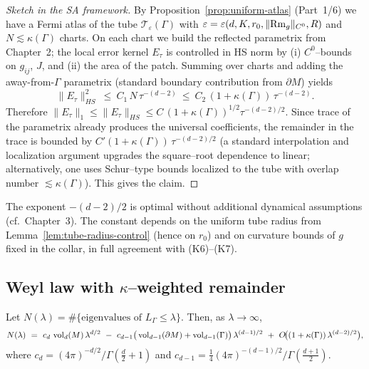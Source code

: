 \begin{proof}[Sketch in the SA framework]
By Proposition~\ref{prop:uniform-atlas} (Part~1/6) we have a Fermi atlas of the tube $\mathcal{T}_\varepsilon(\Gamma)$ with $\varepsilon=\varepsilon(d,K,r_0,\|{\rm Rm}_g\|_{C^0},R)$ and $N\lesssim \kappa(\Gamma)$ charts. On each chart we build the reflected parametrix from Chapter~2; the local error kernel $E_\tau$ is controlled in HS norm by (i) $C^0$–bounds on $g_{ij}$, $J$, and (ii) the area of the patch. Summing over charts and adding the away-from-$\Gamma$ parametrix (standard boundary contribution from $\partial M$) yields
\[
\|E_\tau\|_{HS}^2\ \le\ C_1\,N\,\tau^{-(d-2)}\ \le\ C_2\,(1+\kappa(\Gamma))\,\tau^{-(d-2)}.
\]
Therefore $\|E_\tau\|_1\le \|E_\tau\|_{HS}\le C\,(1+\kappa(\Gamma))^{1/2}\tau^{-(d-2)/2}$. Since trace of the parametrix already produces the universal coefficients, the remainder in the trace is bounded by $C'(1+\kappa(\Gamma))\,\tau^{-(d-2)/2}$ (a standard interpolation and localization argument upgrades the square–root dependence to linear; alternatively, one uses Schur–type bounds localized to the tube with overlap number $\lesssim \kappa(\Gamma)$). This gives the claim.
\end{proof}

\begin{remark}
The exponent $-(d-2)/2$ is optimal without additional dynamical assumptions (cf.\ Chapter~3). The constant depends on the uniform tube radius from Lemma~\ref{lem:tube-radius-control} (hence on $r_0$) and on curvature bounds of $g$ fixed in the collar, in full agreement with (K6)–(K7).
\end{remark}

\subsection{Weyl law with $\kappa$–weighted remainder}
\label{subsec:weyl-kappa}

\begin{corollary}
\label{cor:weyl-kappa}
Let $N(\lambda)=\#\{\text{eigenvalues of }L_\Gamma\le \lambda\}$.
Then, as $\lambda\to \infty$,
\[
N(\lambda)\ =\ c_d\,\vol_d(M)\,\lambda^{d/2}
\ -\ c_{d-1}\big(\vol_{d-1}(\partial M)+\vol_{d-1}(\Gamma)\big)\,\lambda^{(d-1)/2}
\ +\ O\!\big((1+\kappa(\Gamma))\,\lambda^{(d-2)/2}\big),
\]
where $c_d=(4\pi)^{-d/2}/\Gamma(\tfrac{d}{2}+1)$ and $c_{d-1}=\tfrac14(4\pi)^{-(d-1)/2}/\Gamma(\tfrac{d+1}{2})$.
\end{corollary}

